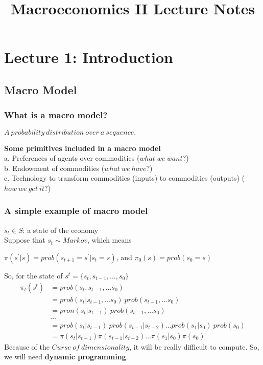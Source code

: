 \documentclass{article}
\title{Macroeconomics II Lecture Notes}
\begin{document}
\maketitle
\newpage
\tableofcontents


\newpage
\section{Lecture 1: Introduction}%

\subsection{Macro Model}

\subsubsection{What is a macro model?}
\centerline{$A\ probability\ distribution\ over\ a\ sequence.$}
\textbf{Some primitives included in a macro model}\\
a. Preferences of agents over commodities ($what\ we\ want?$)\\
b. Endowment of commodities ($what\ we\ have?$)\\
c. Technology to transform commodities (inputs) to commodities (outputs) ($how\ we\ get\ it?$)

\subsubsection{A simple example of macro model}
$s_t \in S$: a state of the economy\\
Suppose that $s_t \sim Markov$, which means\\
\centerline{$\pi(s^\prime | s) = prob(s_{t + 1} = s^\prime | s_t = s)$, and $\pi_0(s) = prob(s_0 = s)$}
So, for the state of $s^t = \{s_t, s_{t-1}, \ldots, s_0\}$
\begin{align*}
	\pi_t(s^t) &= prob(s_t, s_{t-1}, \ldots s_0)	\\
	&= prob(s_t | s_{t-1}, \ldots s_0)\ prob(s_{t-1}, \ldots s_0)\\
	&= pron(s_t | s_{t-1})\ prob(s_{t-1}, \ldots s_0)\\
	&\ldots\\
	&= prob(s_t | s_{t-1})\ prob(s_{t-1} | s_{t-2})\ldots prob(s_1 | s_0)\ prob(s_0)\\
	&= \pi(s_t | s_{t-1})\pi(s_{t-1} | s_{t-2})\ldots \pi(s_1 | s_0)\pi(s_0)
\end{align*}
Because of the $Curse\ of\ dimensionality$, it will be really difficult to compute. So, we will need \textbf{dynamic programming}.
\end{document}
